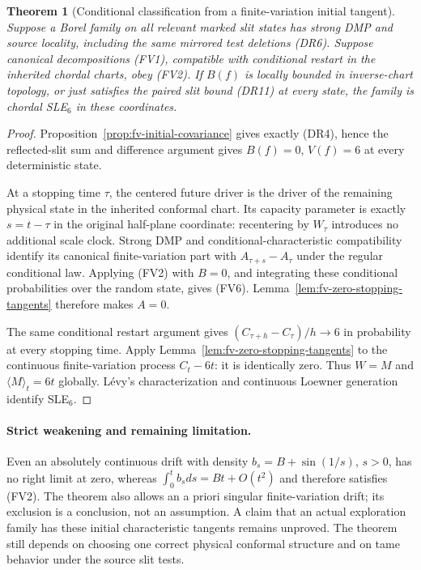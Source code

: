 \documentclass[11pt]{article}
\newtheorem{theorem}{Theorem}[section]
\theoremstyle{definition}\newtheorem{definition}[theorem]{Definition}
\theoremstyle{remark}\newtheorem{remark}[theorem]{Remark}
\begin{document}
\begin{theorem}[Conditional classification from a finite-variation initial tangent]
\label{thm:fv-tangent-rigidity}
Suppose a Borel family on all relevant marked slit states has strong DMP
and source locality, including the same mirrored test deletions (DR6).
Suppose canonical decompositions (FV1), compatible with conditional restart
in the inherited chordal charts, obey (FV2). If $B(f)$ is locally bounded
in inverse-chart topology, or just satisfies the paired slit bound (DR11)
at every state, the family is chordal SLE$_6$ in these coordinates.
\end{theorem}
\begin{proof}
Proposition~\ref{prop:fv-initial-covariance} gives exactly (DR4), hence
the reflected-slit sum and difference argument gives $B(f)=0$, $V(f)=6$
at every deterministic state.

At a stopping time $\tau$, the centered future driver is the driver of
the remaining physical state in the inherited conformal chart. Its
capacity parameter is exactly $s=t-\tau$ in the original half-plane
coordinate: recentering by $W_\tau$ introduces no additional scale clock.
Strong DMP and conditional-characteristic compatibility identify its
canonical finite-variation part with $A_{\tau+s}-A_\tau$ under the
regular conditional law. Applying (FV2) with $B=0$, and integrating these
conditional probabilities over the random state, gives (FV6).
Lemma~\ref{lem:fv-zero-stopping-tangents} therefore makes $A=0$.

The same conditional restart argument gives
$(C_{\tau+h}-C_\tau)/h\to6$ in probability at every stopping time.
Apply Lemma~\ref{lem:fv-zero-stopping-tangents} to the continuous
finite-variation process $C_t-6t$: it is identically zero.
Thus $W=M$ and $\langle M\rangle_t=6t$ globally.
L\'evy's characterization and continuous Loewner generation identify SLE$_6$.
\end{proof}

\paragraph{Strict weakening and remaining limitation.}
Even an absolutely continuous drift with density
$b_s=B+\sin(1/s)$, $s>0$, has no right limit at zero, whereas
$\int_0^t b_sds=Bt+O(t^2)$ and therefore satisfies (FV2).
The theorem also allows an a priori singular finite-variation drift;
its exclusion is a conclusion, not an assumption. A claim that an actual
exploration family has these initial characteristic tangents remains
unproved. The theorem still depends on choosing one correct physical
conformal structure and on tame behavior under the source slit tests.
\end{document}
